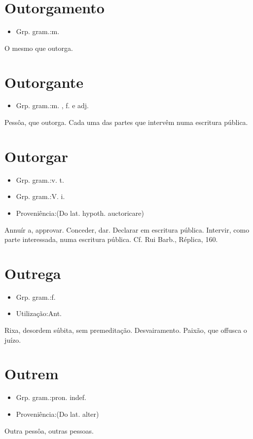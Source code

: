 \section{Outorgamento}
\begin{itemize}
\item {Grp. gram.:m.}
\end{itemize}
O mesmo que \textunderscore outorga\textunderscore .
\section{Outorgante}
\begin{itemize}
\item {Grp. gram.:m. ,  f.  e  adj.}
\end{itemize}
Pessôa, que outorga.
Cada uma das partes que intervêm numa escritura pública.
\section{Outorgar}
\begin{itemize}
\item {Grp. gram.:v. t.}
\end{itemize}
\begin{itemize}
\item {Grp. gram.:V. i.}
\end{itemize}
\begin{itemize}
\item {Proveniência:(Do lat. hypoth. \textunderscore auctoricare\textunderscore )}
\end{itemize}
Annuír a, approvar.
Conceder, dar.
Declarar em escritura pública.
Intervir, como parte interessada, numa escritura pública. Cf. Rui Barb., \textunderscore Réplica\textunderscore , 160.
\section{Outrega}
\begin{itemize}
\item {Grp. gram.:f.}
\end{itemize}
\begin{itemize}
\item {Utilização:Ant.}
\end{itemize}
Rixa, desordem súbita, sem premeditação.
Desvairamento.
Paixão, que offusca o juízo.
\section{Outrem}
\begin{itemize}
\item {Grp. gram.:pron. indef.}
\end{itemize}
\begin{itemize}
\item {Proveniência:(Do lat. \textunderscore alter\textunderscore )}
\end{itemize}
Outra pessôa, outras pessoas.
